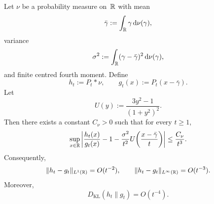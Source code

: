 \begin{proposition}%
\label{thm:poisson-second-order}
Let $\nu$ be a probability measure on~$\mathbb{R}$ with mean
\[
\bar\gamma:=\int_{\mathbb{R}}\gamma\,\mathrm{d}\nu(\gamma),
\]
variance
\[
\sigma^{2}:=\int_{\mathbb{R}}(\gamma-\bar\gamma)^{2}\,\mathrm{d}\nu(\gamma),
\]
and finite centred fourth moment.  Define
\[
h_t:=P_t*\nu,
\qquad
g_t(x):=P_t(x-\bar\gamma).
\]
Let
\[
U(y):=\frac{3y^{2}-1}{(1+y^{2})^{2}}.
\]
Then there exists a constant $C_\nu>0$ such that for every $t\ge 1$,
\begin{equation}\label{eq:poisson-profile}
\sup_{x\in\mathbb{R}}\left|
\frac{h_t(x)}{g_t(x)}
-1
-\frac{\sigma^{2}}{t^{2}}U\!\left(\frac{x-\bar\gamma}{t}\right)
\right|
\le \frac{C_\nu}{t^{3}}.
\end{equation}
Consequently,
\begin{equation}\label{eq:poisson-l1-rate}
\|h_t-g_t\|_{L^{1}(\mathbb{R})}=O(t^{-2}),
\qquad
\|h_t-g_t\|_{L^\infty(\mathbb{R})}=O(t^{-3}).
\end{equation}
Moreover,
\begin{equation}\label{eq:poisson-kl-rate}
D_{\mathrm{KL}}(h_t\|g_t)=O(t^{-4}).
\end{equation}
\end{proposition}

